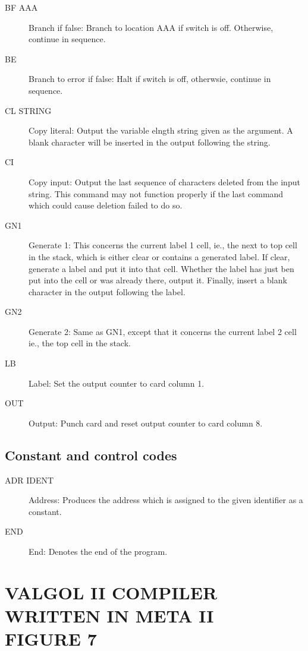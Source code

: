 \documentclass[twocolumn]{article}
\begin{document}
\begin{description}
\item[BF  AAA] Branch if false: Branch to location AAA if switch is off.
Otherwise, continue in sequence.
\item[BE] Branch to error if false: Halt if switch is off, otherwsie,
continue in sequence.
\item[CL  STRING] Copy literal: Output the variable elngth string given as the
argument.
A blank character will be inserted in the output following the string.
\item[CI] Copy input: Output the last sequence of characters deleted from the
input string. This command may not function properly if the last command
which could cause deletion failed to do so.
\item[GN1] Generate 1: This concerns the current label 1 cell, ie., the next
to top cell in the stack, which is either clear or contains a generated label.
If clear, generate a label and put it into that cell.
Whether the label has just ben put into the cell or was already there, output
it.
Finally, insert a blank character in the output following the label.
\item[GN2] Generate 2: Same as GN1, except that it concerns the current label
2 cell ie., the top cell in the stack.
\item[LB] Label: Set the output counter to card column 1.
\item[OUT] Output: Punch card and reset output counter to card column 8.
\end{description}

\subsection{Constant and control codes}
\begin{description}
\item[ADR IDENT] Address: Produces the address which is assigned to the given
identifier as a constant.
\item[END] End: Denotes the end of the program.
\end{description}

\pagebreak

\section{VALGOL II COMPILER WRITTEN IN META II\\FIGURE 7}
\end{document}
